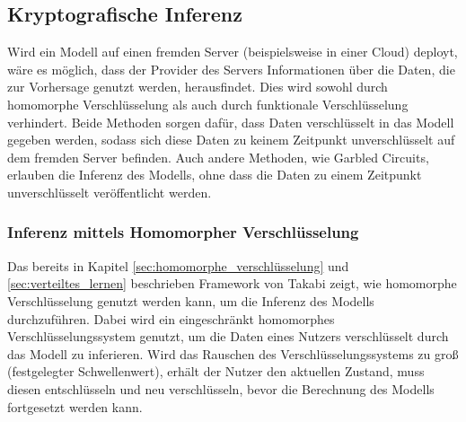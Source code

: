 \subsection{Kryptografische Inferenz}\label{sec:krypto_inferenz}

Wird ein Modell auf einen fremden Server (beispielsweise in einer Cloud) deployt, wäre es möglich, dass der Provider des Servers Informationen über die Daten, die zur Vorhersage genutzt werden, herausfindet.
Dies wird sowohl durch homomorphe Verschlüsselung als auch durch funktionale Verschlüsselung verhindert.
Beide Methoden sorgen dafür, dass Daten verschlüsselt in das Modell gegeben werden, sodass sich diese Daten zu keinem Zeitpunkt unverschlüsselt auf dem fremden Server befinden.
Auch andere Methoden, wie Garbled Circuits, erlauben die Inferenz des Modells, ohne dass die Daten zu einem Zeitpunkt unverschlüsselt veröffentlicht werden.


\subsubsection*{Inferenz mittels Homomorpher Verschlüsselung}
Das bereits in Kapitel \ref{sec:homomorphe_verschlüsselung} und \ref{sec:verteiltes_lernen} beschrieben Framework von Takabi \etal \cite{P-104} zeigt, wie homomorphe Verschlüsselung genutzt werden kann, um die Inferenz des Modells durchzuführen.
Dabei wird ein eingeschränkt homomorphes Verschlüsselungssystem genutzt, um die Daten eines Nutzers verschlüsselt durch das Modell zu inferieren.
Wird das Rauschen des Verschlüsselungssystems zu groß (festgelegter Schwellenwert), erhält der Nutzer den aktuellen Zustand, muss diesen entschlüsseln und neu verschlüsseln, bevor die Berechnung des Modells fortgesetzt werden kann.

